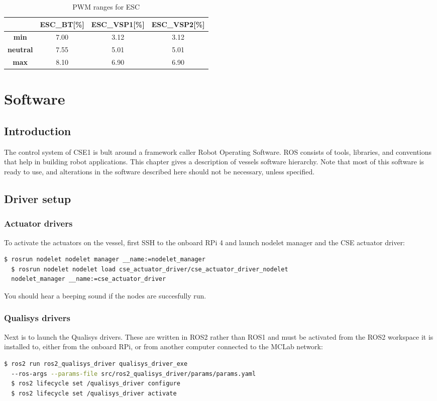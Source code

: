 \begin{table}[h!]
	\centering
	\caption{PWM ranges for ESC}
	\label{tab:pwm_range}
	\begin{tabular}{cccc}
		\hline
		& \textbf{ESC\_BT}[\%] & \textbf{ESC\_VSP1}[\%] & \textbf{ESC\_VSP2}[\%]\\ \hline
		\textbf{min} & 7.00 & 3.12 & 3.12\\
		\textbf{neutral} & 7.55 & 5.01 & 5.01\\
		\textbf{max} & 8.10 & 6.90 & 6.90\\ \hline
	\end{tabular}
\end{table}

\chapter{Software}
\section{Introduction}

The control system of CSE1 is bult around a framework caller Robot Operating Software. ROS consists of tools, libraries, and conventions that help in building robot applications. This chapter gives a description of vessels software hierarchy. Note that most of this software is ready to use, and alterations in the software described here should not be necessary, unless specified.


\section{Driver setup}

\subsection{Actuator drivers}
To activate the actuators on the vessel, first SSH to the onboard RPi 4 and launch nodelet manager and the CSE actuator driver:
\begin{lstlisting}[language=bash,basicstyle=\mlttfamily, breaklines=true]
  $ rosrun nodelet nodelet manager __name:=nodelet_manager
  $ rosrun nodelet nodelet load cse_actuator_driver/cse_actuator_driver_nodelet  
  nodelet_manager __name:=cse_actuator_driver
\end{lstlisting}
You should hear a beeping sound if the nodes are succesfully run. 
\subsection{Qualisys drivers}
Next is to launch the Qualisys drivers. These are written in ROS2 rather than ROS1 and  must be activated from the ROS2 workspace it is installed to, either from the onboard RPi, or from another computer connected to the MCLab network: 
\begin{lstlisting}[language=bash,basicstyle=\mlttfamily, breaklines=true]
  $ ros2 run ros2_qualisys_driver qualisys_driver_exe 
  --ros-args --params-file src/ros2_qualisys_driver/params/params.yaml
  $ ros2 lifecycle set /qualisys_driver configure
  $ ros2 lifecycle set /qualisys_driver activate
\end{lstlisting}

